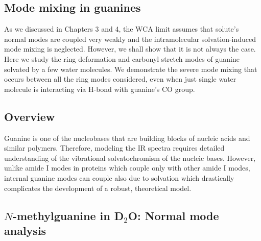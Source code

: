 \documentclass[a4paper,titlepage,twoside,fleqn,12pt]{book}
\begin{document}
\begin{refsection}
\chapter{Mode mixing in guanines}

As we discussed in Chapters 3 and 4, the WCA limit assumes
that solute's normal modes are coupled very weakly and the intramolecular
solvation\hyp{}induced mode mixing is neglected. However, we shall
show that it is not always the case. Here we study the ring deformation
and carbonyl stretch modes of guanine solvated by a few water
molecules. We demonstrate the severe mode mixing that occurs
between all the ring modes considered, even when just single water molecule
is interacting via H-bond with guanine's CO group. 

\section{Overview}

Guanine is one of the nucleobases that are building blocks of
nucleic acids and similar polymers. Therefore, modeling the
IR spectra requires detailed understanding of the vibrational
solvatochromism of the nucleic bases. However, unlike amide I modes
in proteins which couple only with other amide I modes, 
internal guanine modes can couple also due to solvation
which drastically complicates the development of a robust, 
theoretical model.

\section{$N$-methylguanine in D$_2$O: Normal mode analysis}


\end{refsection}
\end{document}

